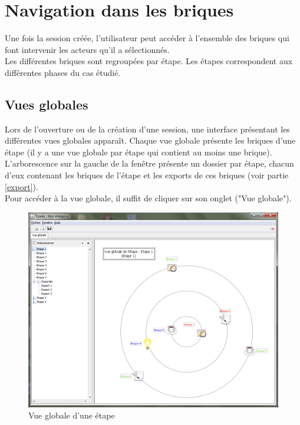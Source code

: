 \chapter{Navigation dans les briques}


Une fois la session créée, l'utilisateur peut accéder à l'ensemble des briques qui font intervenir les acteurs qu'il a sélectionnés.\\

Les différentes briques sont regroupées par étape. Les étapes correspondent aux différentes phases du cas étudié.\\

\section{Vues globales}

Lors de l'ouverture ou de la création d'une session, une interface présentant les différentes vues globales apparaît. Chaque vue globale présente les briques d'une étape (il y a une vue globale par étape qui contient au moins une brique). L'arborescence sur la gauche de la fenêtre présente un dossier par étape, chacun d'eux contenant les briques de l'étape et les exports de ces briques (voir partie \ref{export}).\\

Pour accéder à la vue globale, il suffit de cliquer sur son onglet ("Vue globale"). 

\begin{figure}[h!]
\centering

\includegraphics[scale=0.35]{images/vue_globale.png}
\caption{Vue globale d'une étape}

\end{figure}

